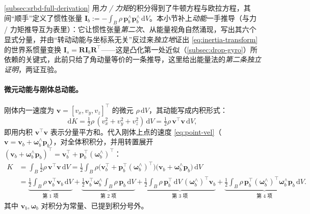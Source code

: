 \cref{subsec:srbd-full-derivation} 用\emph{力 / 力矩}的积分得到了牛顿方程与欧拉方程，其间“顺手”定义了惯性张量 $\mathbf{I}_b:=-\int_B\rho\,\boldsymbol{p}_b^\wedge\boldsymbol{p}_b^\wedge\,\mathrm{d}V$。本小节补上\emph{动能}一手推导（与力 / 力矩推导互为表里）：它让惯性张量\emph{第二次}、从能量视角自然涌现，写出其六个显式分量，并由“转动动能与坐标系无关”反过来\emph{独立地}证出 \cref{eq:inertia-transform} 的世界系惯量变换 $\mathbf{I}_s=\mathbf{R}\mathbf{I}_b\mathbf{R}^\top$——这是凸化第一处近似（\cref{subsec:drop-gyro}）所依赖的关键式，此前只给了角动量等价的一条推导，这里给出能量法的\emph{第二条独立证明}，两证互验。

\paragraph{微元动能与刚体总动能。}
刚体内一速度为 $\boldsymbol{v}=[v_x,v_y,v_z]^\top$ 的微元 $\rho\,\mathrm{d}V$，其动能写成内积形式\cite{unitree2023quadruped}：
\begin{equation}
  \mathrm{d}K=\tfrac12\rho\,(v_x^2+v_y^2+v_z^2)\,\mathrm{d}V=\tfrac12\rho\,\boldsymbol{v}^\top\boldsymbol{v}\,\mathrm{d}V,
  \label{eq:dK}
\end{equation}
即用内积 $\boldsymbol{v}^\top\boldsymbol{v}$ 表示分量平方和。代入刚体上点的速度 \cref{eq:point-vel}（$\boldsymbol{v}=\boldsymbol{v}_b+\boldsymbol{\omega}_b^\wedge\boldsymbol{p}_b$），对全体积积分，并用转置展开 $(\boldsymbol{v}_b+\boldsymbol{\omega}_b^\wedge\boldsymbol{p}_b)^\top=\boldsymbol{v}_b^\top+\boldsymbol{p}_b^\top(\boldsymbol{\omega}_b^\wedge)^\top$\cite{unitree2023quadruped}：
\begin{equation}
\begin{aligned}
  K&=\int_B\tfrac12\rho\,\boldsymbol{v}^\top\boldsymbol{v}\,\mathrm{d}V
  =\tfrac12\int_B\rho\big(\boldsymbol{v}_b^\top+\boldsymbol{p}_b^\top(\boldsymbol{\omega}_b^\wedge)^\top\big)\big(\boldsymbol{v}_b+\boldsymbol{\omega}_b^\wedge\boldsymbol{p}_b\big)\,\mathrm{d}V\\
  &=\underbrace{\tfrac12\int_B\rho\,\boldsymbol{v}_b^\top\boldsymbol{v}_b\,\mathrm{d}V}_{\text{第 1 项}}
  +\underbrace{\tfrac12\boldsymbol{v}_b^\top\boldsymbol{\omega}_b^\wedge\!\int_B\rho\,\boldsymbol{p}_b\,\mathrm{d}V}_{\text{第 2 项}}
  +\underbrace{\tfrac12\!\int_B\rho\,\boldsymbol{p}_b^\top\,\mathrm{d}V\,(\boldsymbol{\omega}_b^\wedge)^\top\boldsymbol{v}_b}_{\text{第 3 项}}
  +\underbrace{\tfrac12\!\int_B\rho\,\boldsymbol{p}_b^\top(\boldsymbol{\omega}_b^\wedge)^\top\boldsymbol{\omega}_b^\wedge\boldsymbol{p}_b\,\mathrm{d}V}_{\text{第 4 项}}.
\end{aligned}
\label{eq:K-expand}
\end{equation}
其中 $\boldsymbol{v}_b,\boldsymbol{\omega}_b$ 对积分为常量、已提到积分号外。

